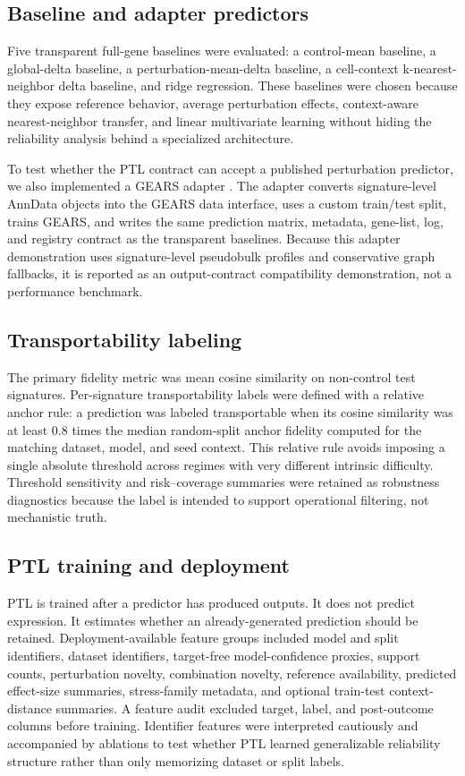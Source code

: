 \subsection{Baseline and adapter predictors}

Five transparent full-gene baselines were evaluated: a control-mean baseline, a global-delta baseline, a perturbation-mean-delta baseline, a cell-context k-nearest-neighbor delta baseline, and ridge regression. These baselines were chosen because they expose reference behavior, average perturbation effects, context-aware nearest-neighbor transfer, and linear multivariate learning without hiding the reliability analysis behind a specialized architecture.

To test whether the PTL contract can accept a published perturbation predictor, we also implemented a GEARS adapter \citep{roohani2023gears}. The adapter converts signature-level AnnData objects into the GEARS data interface, uses a custom train/test split, trains GEARS, and writes the same prediction matrix, metadata, gene-list, log, and registry contract as the transparent baselines. Because this adapter demonstration uses signature-level pseudobulk profiles and conservative graph fallbacks, it is reported as an output-contract compatibility demonstration, not a performance benchmark.

\subsection{Transportability labeling}

The primary fidelity metric was mean cosine similarity on non-control test signatures. Per-signature transportability labels were defined with a relative anchor rule: a prediction was labeled transportable when its cosine similarity was at least \(0.8\) times the median random-split anchor fidelity computed for the matching dataset, model, and seed context. This relative rule avoids imposing a single absolute threshold across regimes with very different intrinsic difficulty. Threshold sensitivity and risk--coverage summaries were retained as robustness diagnostics because the label is intended to support operational filtering, not mechanistic truth.

\subsection{PTL training and deployment}

PTL is trained after a predictor has produced outputs. It does not predict expression. It estimates whether an already-generated prediction should be retained. Deployment-available feature groups included model and split identifiers, dataset identifiers, target-free model-confidence proxies, support counts, perturbation novelty, combination novelty, reference availability, predicted effect-size summaries, stress-family metadata, and optional train-test context-distance summaries. A feature audit excluded target, label, and post-outcome columns before training. Identifier features were interpreted cautiously and accompanied by ablations to test whether PTL learned generalizable reliability structure rather than only memorizing dataset or split labels.

